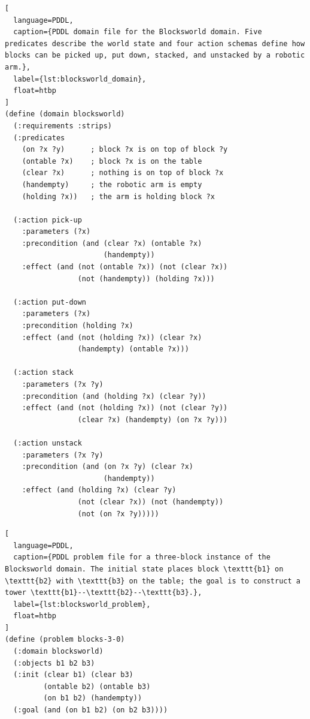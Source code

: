 \begin{lstlisting}[
  language=PDDL,
  caption={PDDL domain file for the Blocksworld domain. Five predicates describe the world state and four action schemas define how blocks can be picked up, put down, stacked, and unstacked by a robotic arm.},
  label={lst:blocksworld_domain},
  float=htbp
]
(define (domain blocksworld)
  (:requirements :strips)
  (:predicates
    (on ?x ?y)      ; block ?x is on top of block ?y
    (ontable ?x)    ; block ?x is on the table
    (clear ?x)      ; nothing is on top of block ?x
    (handempty)     ; the robotic arm is empty
    (holding ?x))   ; the arm is holding block ?x

  (:action pick-up
    :parameters (?x)
    :precondition (and (clear ?x) (ontable ?x)
                       (handempty))
    :effect (and (not (ontable ?x)) (not (clear ?x))
                 (not (handempty)) (holding ?x)))

  (:action put-down
    :parameters (?x)
    :precondition (holding ?x)
    :effect (and (not (holding ?x)) (clear ?x)
                 (handempty) (ontable ?x)))

  (:action stack
    :parameters (?x ?y)
    :precondition (and (holding ?x) (clear ?y))
    :effect (and (not (holding ?x)) (not (clear ?y))
                 (clear ?x) (handempty) (on ?x ?y)))

  (:action unstack
    :parameters (?x ?y)
    :precondition (and (on ?x ?y) (clear ?x)
                       (handempty))
    :effect (and (holding ?x) (clear ?y)
                 (not (clear ?x)) (not (handempty))
                 (not (on ?x ?y)))))
\end{lstlisting}

\begin{lstlisting}[
  language=PDDL,
  caption={PDDL problem file for a three-block instance of the Blocksworld domain. The initial state places block \texttt{b1} on \texttt{b2} with \texttt{b3} on the table; the goal is to construct a tower \texttt{b1}--\texttt{b2}--\texttt{b3}.},
  label={lst:blocksworld_problem},
  float=htbp
]
(define (problem blocks-3-0)
  (:domain blocksworld)
  (:objects b1 b2 b3)
  (:init (clear b1) (clear b3)
         (ontable b2) (ontable b3)
         (on b1 b2) (handempty))
  (:goal (and (on b1 b2) (on b2 b3))))
\end{lstlisting}

